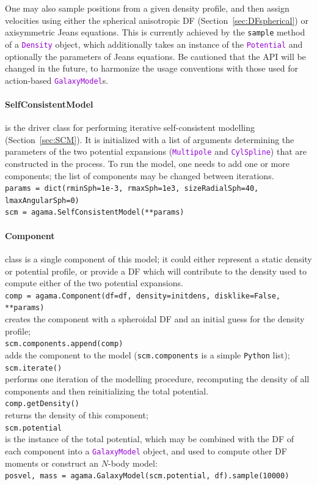 \documentclass[12pt]{article}
\newcommand{\Python}{\texttt{Python}\xspace}
\newcommand{\ttt}[1]{\textcolor{darkviolet}{\texttt{#1}}}
\begin{document}
One may also sample positions from a given density profile, and then assign velocities using either the spherical anisotropic DF (Section~\ref{sec:DFspherical}) or axisymmetric Jeans equations. This is currently achieved by the \texttt{sample} method of a \ttt{Density} object, which additionally takes an instance of the \ttt{Potential} and optionally the parameters of Jeans equations. Be cautioned that the API will be changed in the future, to harmonize the usage conventions with those used for action-based \ttt{GalaxyModel}s.

\paragraph{SelfConsistentModel} is the driver class for performing iterative self-consistent modelling (Section~\ref{sec:SCM}). It is initialized with a list of arguments determining the parameters of the two potential expansions (\ttt{Multipole} and \ttt{CylSpline}) that are constructed in the process. To run the model, one needs to add one or more components; the list of components may be changed between iterations.\\
\texttt{params = dict(rminSph=1e-3, rmaxSph=1e3, sizeRadialSph=40, lmaxAngularSph=0)}\\
\texttt{scm = agama.SelfConsistentModel(**params)}

\paragraph{Component} class is a single component of this model; it could either represent a static density or potential profile, or provide a DF which will contribute to the density used to compute either of the two potential expansions.\\[2mm]
\texttt{comp = agama.Component(df=df, density=initdens, disklike=False, **params)}\\
creates the component with a spheroidal DF and an initial guess for the density profile;\\[2mm]
\texttt{scm.components.append(comp)}\\
adds the component to the model (\texttt{scm.components} is a simple \Python list);\\[2mm]
\texttt{scm.iterate()}\\
performs one iteration of the modelling procedure, recomputing the density of all components and then reinitializing the total potential.\\[2mm]
\texttt{comp.getDensity()}\\
returns the density of this component; \\[2mm]
\texttt{scm.potential}\\ is the instance of the total potential, which may be combined with the DF of each component into a \ttt{GalaxyModel} object, and used to compute other DF moments or construct an $N$-body model:\\
\texttt{posvel, mass = agama.GalaxyModel(scm.potential, df).sample(10000)}
\end{document}
